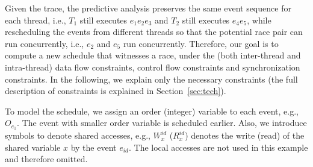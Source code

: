 Given the trace, the predictive analysis preserves the same event sequence for each thread, i.e., $T_1$ still executes $e_1 e_2 e_3$ and $T_2$ still executes $e_4 e_5$, 
while rescheduling the events from different threads so that the potential race pair can run concurrently, i.e., $e_2$ and $e_5$ run concurrently. Therefore, our goal is to compute a new schedule that witnesses a race, under the (both inter-thread and intra-thread) data flow constraints, control flow constraints and synchronization constraints. In the following, we explain only the necessary constraints (the full description of constraints is explained in Section~\ref{sec:tech}).


To model the schedule, we assign an order (integer) variable to each event, e.g., $O_{e_1}$. The event with smaller order variable is scheduled earlier.
Also, we introduce symbols to denote shared accesses, e.g., $W^{id}_{x}$ ($R^{id}_{x}$) denotes the write (read) of the shared variable $x$ by the event $e_{id}$.
The local accesses are not used in this example and therefore omitted.









